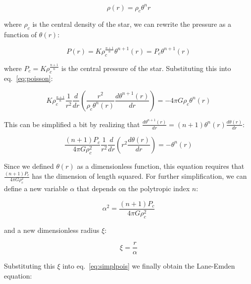 \documentclass{article}
\begin{document}
            \begin{equation}
                \label{eq:thetar}
                \rho(r)=\rho_c\theta^n{r}
            \end{equation}

            where \(\rho_c\) is the central density of the star, we can rewrite
            the pressure as a function of \(\theta(r)\):

            \[
                P(r)=K\rho_c^{\frac{n+1}{n}}\theta^{n+1}(r)=P_c\theta^{n+1}(r)
            \]

            where \(P_c=K\rho_c^{\frac{n+1}{n}}\) is the central pressure of the
            star. Substituting this into eq.~\ref{eq:poisson}:

            \[
                K\rho_c^{\frac{n+1}{n}}\frac{1}{r^2}\frac{d}{dr}\left(\frac{r^2}{\rho_c\theta^n(r)}\frac{d\theta^{n+1}(r)}{dr}\right)=-4\pi
                G\rho_c\theta^n(r)
            \]

            This can be simplified a bit by realizing that
            \(\frac{d\theta^{n+1}(r)}{dr}=(n+1)\theta^n(r)\frac{d\theta(r)}{dr}\):

            \begin{equation}
                \label{eq:simplpois}
                \frac{(n+1)P_c}{4\pi
                G\rho_c^2}\frac{1}{r^2}\frac{d}{dr}\left(r^2\frac{d\theta(r)}{dr}\right)=-\theta^n(r)
            \end{equation}

            Since we defined \(\theta(r)\) as a dimensionless function, this
            equation requires that \(\frac{(n+1)P_c}{4\pi G\rho_c^2}\) has the
            dimension of length squared. For further simplification, we can
            define a new variable \(\alpha\) that depends on the polytropic
            index \(n\):

            \begin{equation}
                \label{eq:alpha}
                \alpha^2=\frac{(n+1)P_c}{4\pi G\rho_c^2}
            \end{equation}

            and a new dimensionless radius \(\xi\):

            \begin{equation}
                \label{eq:xi}
                \xi=\frac{r}{\alpha}
            \end{equation}

            Substituting this \(\xi\) into eq.~\ref{eq:simplpois} we finally
            obtain the Lane-Emden equation:
\end{document}

